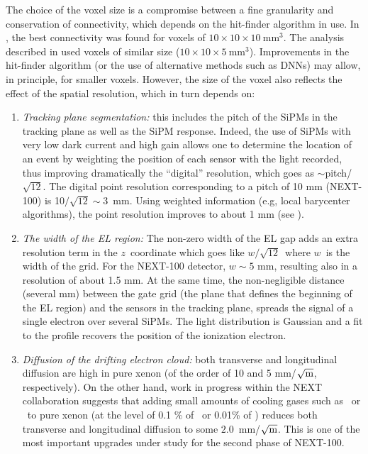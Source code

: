 \documentclass[a4paper,11pt]{article}
\begin{document}
The choice of the voxel size is a compromise between a fine granularity and conservation of connectivity, which depends on the hit-finder algorithm in use. In \cite{NEXT_topology},  the best connectivity  was  found for voxels of 
$10 \times 10 \times 10 \mathrm{~mm^3}$. The analysis described in \cite{NEXT_sensitivity} used voxels
of similar size ($10 \times 10 \times 5 \mathrm{~mm^3}$).  Improvements in the hit-finder algorithm (or the use of alternative methods such as DNNs) may allow, in principle, for smaller voxels. However, the size of the voxel also reflects the effect of the spatial resolution, which in turn depends on: 

\begin{enumerate}
\item {\em Tracking plane segmentation:} this includes the pitch of the SiPMs in the tracking plane as well as the SiPM response. Indeed, the use of SiPMs with very low dark current and high gain allows one to determine the location of an event by weighting the position of each sensor with the light recorded, thus improving dramatically the ``digital'' resolution, which goes as $\sim$pitch/$\sqrt{12}$. The digital point resolution corresponding to a pitch of 10 mm (NEXT-100) is 10$/\sqrt{12} \sim 3$~mm. Using weighted information (e.g, local barycenter algorithms), the point resolution improves to about 1 mm (see \cite{Lorca:2014sra}). 
\item {\em The width of the EL region:}
The non-zero width of the EL gap adds an extra resolution term in the $z$~coordinate which goes like $w/\sqrt{12}$~where $w$~is the width of the grid. For the NEXT-100 detector, $w\sim 5$ mm, resulting also in a resolution of about 1.5 mm. At the same time, the non-negligible distance (several mm) between the gate grid (the plane that defines the beginning of the EL region) and the sensors in the tracking plane, spreads the signal of a single electron over several SiPMs. The light distribution is Gaussian and a fit to the profile recovers the position of the ionization electron.
\item {\em Diffusion of the drifting electron cloud:} both transverse and longitudinal diffusion are high in pure xenon (of the order of 10 and 5 mm/$\sqrt{\rm{m}}$, respectively). On the other hand, work in progress within the NEXT collaboration \cite{Azevedo:2015eok} suggests that adding small amounts of cooling gases such as \CHF\ or \CFF\ to pure xenon (at the level of 0.1 \% of \CHF\ or 0.01\% of \CFF) reduces both transverse and longitudinal diffusion to some $2.0$~mm/$\sqrt{\rm{m}}$. This is one of the most important upgrades under study for the second phase of NEXT-100. 
\end{enumerate}
\end{document}
